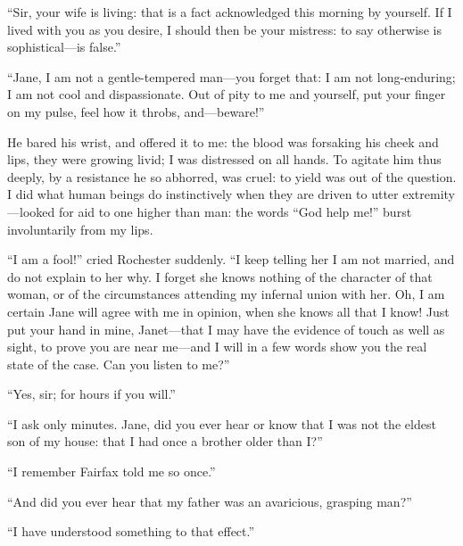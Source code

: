 \enquote{Sir, your wife is living: that is a fact acknowledged this
morning by yourself. If I lived with you as you desire, I should then
be your mistress: to say otherwise is sophistical---is false.}

\enquote{Jane, I am not a gentle-tempered man---you forget that: I am
not long-enduring; I am not cool and dispassionate. Out of pity to me
and yourself, put your finger on my pulse, feel how it throbs,
and---beware!}

He bared his wrist, and offered it to me: the blood was forsaking his
cheek and lips, they were growing livid; I was distressed on all hands. 
To agitate him thus deeply, by a resistance he so abhorred, was cruel:
to yield was out of the question. I did what human beings do
instinctively when they are driven to utter extremity---looked for aid
to one higher than man: the words \enquote{God help me!} burst
involuntarily from my lips.

\enquote{I am a fool!} cried \Mr{} Rochester suddenly. \enquote{I keep
telling her I am not married, and do not explain to her why. I forget
she knows nothing of the character of that woman, or of the
circumstances attending my infernal union with her. Oh, I am certain
Jane will agree with me in opinion, when she knows all that I know! 
Just put your hand in mine, Janet---that I may have the evidence of
touch as well as sight, to prove you are near me---and I will in a few
words show you the real state of the case. Can you listen to me?}

\enquote{Yes, sir; for hours if you will.}

\enquote{I ask only minutes. Jane, did you ever hear or know that I was
not the eldest son of my house: that I had once a brother older than I?}

\enquote{I remember \Mrs{} Fairfax told me so once.}

\enquote{And did you ever hear that my father was an avaricious,
grasping man?}

\enquote{I have understood something to that effect.}

